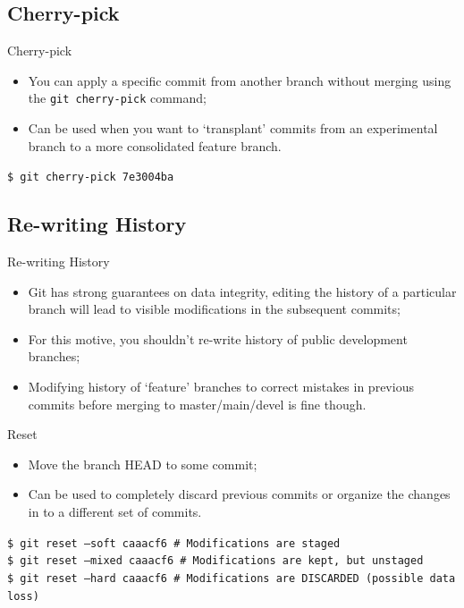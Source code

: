 \documentclass{beamer}
\begin{document}
\subsection{Cherry-pick}
\begin{frame}{Cherry-pick}
  \begin{itemize}
    \item You can apply a specific commit from another branch without merging using the \texttt{git cherry-pick} command;
    \item Can be used when you want to `transplant' commits from an experimental branch to a more consolidated feature branch.
  \end{itemize}
  \begin{block}{}
    \texttt{\$ git cherry-pick 7e3004ba}
  \end{block}
\end{frame}

\subsection{Re-writing History}
\begin{frame}{Re-writing History}
  \begin{itemize}
    \item Git has strong guarantees on data integrity, editing the history of a particular branch will lead to visible modifications in the subsequent commits;
    \item For this motive, you shouldn't re-write history of public development branches;
    \item Modifying history of `feature' branches to correct mistakes in previous commits before merging to master/main/devel is fine though.
  \end{itemize}
\end{frame}

\begin{frame}{Reset}
  \begin{itemize}
    \item Move the branch HEAD to some commit;
    \item Can be used to completely discard previous commits or organize the changes in to a different set of commits.
  \end{itemize}
  \begin{block}{}
    \texttt{\$ git reset --soft caaacf6 \# Modifications are staged} \\
    \texttt{\$ git reset --mixed caaacf6 \# Modifications are kept, but unstaged} \\
    \texttt{\$ git reset --hard caaacf6 \# Modifications are DISCARDED (possible data loss)}
  \end{block}
\end{frame}
\end{document}
